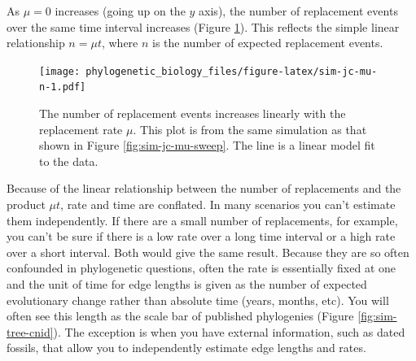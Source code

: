 \documentclass[
]{book}
\begin{document}
As \(\mu=0\) increases (going up on the \(y\) axis), the number of replacement events over the same time interval increases (Figure \ref{fig:sim-jc-mu-n}). This reflects the simple linear relationship \(n=\mu t\), where \(n\) is the number of expected replacement events.

\begin{figure}
\centering
\texttt{[image: phylogenetic\_biology\_files/figure-latex/sim-jc-mu-n-1.pdf]}
\caption{\label{fig:sim-jc-mu-n}The number of replacement events increases linearly with the replacement rate \(\mu\). This plot is from the same simulation as that shown in Figure \ref{fig:sim-jc-mu-sweep}. The line is a linear model fit to the data.}
\end{figure}

Because of the linear relationship between the number of replacements and the product \(\mu t\), rate and time are conflated. In many scenarios you can't estimate them independently. If there are a small number of replacements, for example, you can't be sure if there is a low rate over a long time interval or a high rate over a short interval. Both would give the same result. Because they are so often confounded in phylogenetic questions, often the rate is essentially fixed at one and the unit of time for edge lengths is given as the number of expected evolutionary change rather than absolute time (years, months, etc). You will often see this length as the scale bar of published phylogenies (Figure \ref{fig:sim-tree-cnid}). The exception is when you have external information, such as dated fossils, that allow you to independently estimate edge lengths and rates.
\end{document}
